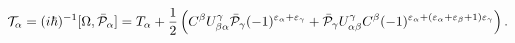 \begin{equation}\label{5.3}
{\cal T}_\alpha=(i\hbar)^{-1}[\Omega,\bar{\cal P}_\alpha]=T_\alpha+
\frac{1}{2}\left(C^\beta U^\gamma_{\beta\alpha}\bar{\cal P}_\gamma
(-1)^{\varepsilon_\alpha+\varepsilon_\gamma}+
\bar{\cal P}_\gamma U^\gamma_{\alpha\beta}C^\beta
(-1)^{\varepsilon_\alpha+
(\varepsilon_\alpha+\varepsilon_\beta+1)\varepsilon_\gamma}\right).
\end{equation}

